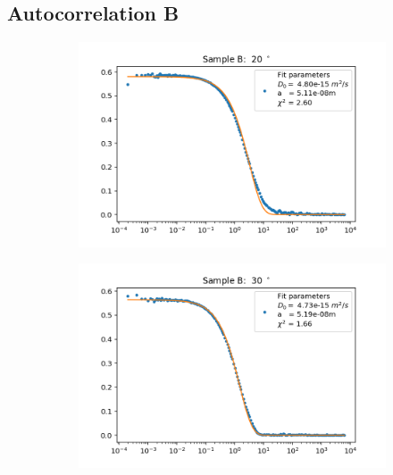 \documentclass[]{article}
\begin{document}
\subsection{Autocorrelation B}
\label{autocorr B}
\begin{figure}[!h]
\centering

\begin{subfigure}{0.48\textwidth}
\includegraphics[width=\linewidth]{Plots/B/20.png}
\end{subfigure}
\begin{subfigure}[c]{0.48\linewidth}
\includegraphics[width=\linewidth]{Plots/B/30.png}
\end{subfigure}


\end{figure}
\end{document}
